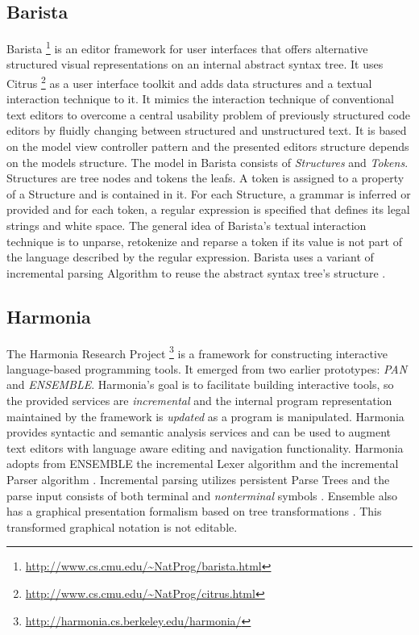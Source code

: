 \subsection{Barista}
Barista \footnote{\raggedright \url{http://www.cs.cmu.edu/~NatProg/barista.html}} is an editor framework for user interfaces that offers alternative structured visual representations on an internal abstract syntax tree. It uses Citrus \footnote{\raggedright \url{http://www.cs.cmu.edu/~NatProg/citrus.html}} as a user interface toolkit \cite{citrus} and adds data structures and a textual interaction technique to it. It mimics the interaction technique of conventional text editors to overcome a central usability problem of previously structured code editors by fluidly changing between structured and unstructured text. It is based on the model view controller pattern \cite{patterns} and the presented editors structure depends on the models structure. The model in Barista consists of \emph{Structures} and \emph{Tokens}. Structures are tree nodes and tokens the leafs. A token is assigned to a property of a Structure and is contained in it. For each Structure, a grammar is inferred or provided and for each token, a regular expression is specified that defines its legal strings and white space. The general idea of Barista's textual interaction technique is to unparse, retokenize and reparse a token if its value is not part of the language described by the regular expression. Barista uses a variant of \cite{iglrPaper} incremental parsing Algorithm to reuse the abstract syntax tree's structure \cite{Barista}. 

\subsection{Harmonia}
The Harmonia Research Project \footnote{\raggedright \url{http://harmonia.cs.berkeley.edu/harmonia/}} is a framework for constructing interactive
language-based programming tools. It emerged from two earlier prototypes: \emph{PAN} and \emph{ENSEMBLE}. Harmonia's goal is to facilitate building interactive tools, so the provided services are \emph{incremental} and the internal program representation maintained by the framework is \emph{updated} as a program is manipulated. Harmonia provides syntactic and semantic analysis services \cite{harmonia} and can be used to augment text editors with language aware editing and navigation functionality. Harmonia adopts from ENSEMBLE the incremental Lexer algorithm \cite{ilex} and the incremental Parser algorithm \cite{iglrPaper}. Incremental parsing utilizes persistent Parse Trees and the parse input consists of both terminal and \emph{nonterminal} symbols \cite{iglrPaper}. Ensemble also has a graphical presentation formalism based on tree transformations \cite{ensemble}. This transformed graphical notation is not editable.

